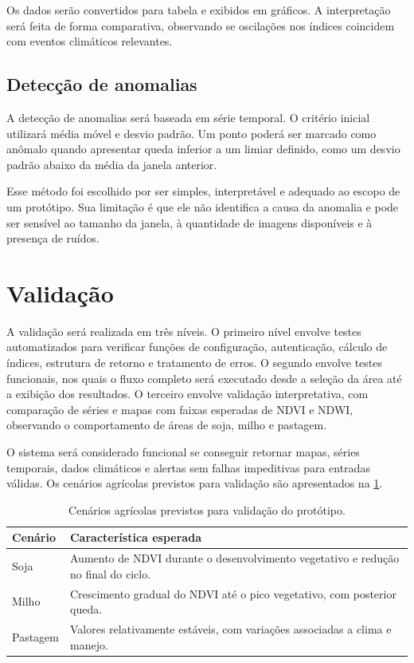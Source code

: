 Os dados serão convertidos para tabela e exibidos em gráficos. A interpretação será feita de forma comparativa, observando se oscilações nos índices coincidem com eventos climáticos relevantes.

\subsection{Detecção de anomalias}

A detecção de anomalias será baseada em série temporal. O critério inicial utilizará média móvel e desvio padrão. Um ponto poderá ser marcado como anômalo quando apresentar queda inferior a um limiar definido, como um desvio padrão abaixo da média da janela anterior.

Esse método foi escolhido por ser simples, interpretável e adequado ao escopo de um protótipo. Sua limitação é que ele não identifica a causa da anomalia e pode ser sensível ao tamanho da janela, à quantidade de imagens disponíveis e à presença de ruídos.

\section{Validação}

A validação será realizada em três níveis. O primeiro nível envolve testes automatizados para verificar funções de configuração, autenticação, cálculo de índices, estrutura de retorno e tratamento de erros. O segundo envolve testes funcionais, nos quais o fluxo completo será executado desde a seleção da área até a exibição dos resultados. O terceiro envolve validação interpretativa, com comparação de séries e mapas com faixas esperadas de NDVI e NDWI, observando o comportamento de áreas de soja, milho e pastagem.

O sistema será considerado funcional se conseguir retornar mapas, séries temporais, dados climáticos e alertas sem falhas impeditivas para entradas válidas. Os cenários agrícolas previstos para validação são apresentados na \cref{tab:cenarios}.

\begin{table}[htb!]
    \centering
    \caption{Cenários agrícolas previstos para validação do protótipo.}
    \label{tab:cenarios}
    \begin{tabular}{|l|p{10.5cm}|}
        \hline
        \textbf{Cenário} & \textbf{Característica esperada} \\ \hline
        Soja & Aumento de NDVI durante o desenvolvimento vegetativo e redução no final do ciclo. \\ \hline
        Milho & Crescimento gradual do NDVI até o pico vegetativo, com posterior queda. \\ \hline
        Pastagem & Valores relativamente estáveis, com variações associadas a clima e manejo. \\ \hline
    \end{tabular}
\end{table}

